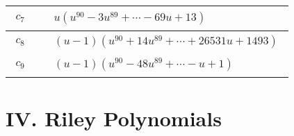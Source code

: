 \documentclass[1p]{elsarticle_modified}
\theoremstyle{definition}
\begin{document}
\begin{tabular}{m{50pt}|m{274pt}}
\hline $$\begin{aligned}c_{7}\end{aligned}$$&$\begin{aligned}
&u(u^{90}-3 u^{89}+\cdots-69 u+13)
\end{aligned}$\\
\hline $$\begin{aligned}c_{8}\end{aligned}$$&$\begin{aligned}
&(u-1)(u^{90}+14 u^{89}+\cdots+26531 u+1493)
\end{aligned}$\\
\hline $$\begin{aligned}c_{9}\end{aligned}$$&$\begin{aligned}
&(u-1)(u^{90}-48 u^{89}+\cdots- u+1)
\end{aligned}$\\
\hline
\end{tabular}\newpage\renewcommand{\arraystretch}{1}
\centering \section*{ IV. Riley Polynomials}
\end{document}
